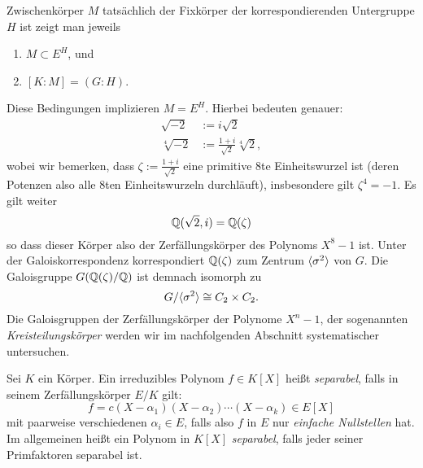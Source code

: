 \documentclass{book}
\begin{document}
\begin{exa}
    Zwischenkörper $M$ tatsächlich der Fixkörper der korrespondierenden
    Untergruppe $H$ ist zeigt man jeweils
    \begin{enumerate}[label = \arabic *.]
        \item $M \subset E^H$, und
        \item $[K:M] = (G:H)$.
    \end{enumerate}
    Diese Bedingungen implizieren $M = E^H$. Hierbei bedeuten genauer:
    \begin{align*}
        \sqrt{-2} & := i \sqrt{2}\\
        \sqrt[4]{-2} & := \frac{1+i}{\sqrt{2}}\sqrt[4]{2},
    \end{align*}
    wobei wir bemerken, dass $\zeta := \frac{1+i}{\sqrt{2}}$ eine primitive
    $8$te Einheitswurzel ist (deren Potenzen also alle $8$ten Einheitswurzeln
    durchläuft), insbesondere gilt $\zeta^4 = -1$. Es gilt weiter
    \[
        \mathbb{Q}(\sqrt{2}, i) = \mathbb{Q}(\zeta) 
    \]
    so dass dieser Körper also der Zerfällungskörper des Polynoms $X^8 - 1$
    ist. Unter der Galoiskorrespondenz korrespondiert $\mathbb{Q}(\zeta)$ zum Zentrum
    $\langle \sigma^2 \rangle$ von $G$. Die Galoisgruppe $G(\mathbb{Q}(\zeta)/\mathbb{Q})$ ist demnach
    isomorph zu
    \[
        G/\langle \sigma^2 \rangle \cong C_2 \times C_2.
    \]
    Die Galoisgruppen der Zerfällungskörper der Polynome $X^n -1$, der
    sogenannten {\em Kreisteilungskörper} werden wir im nachfolgenden Abschnitt
    systematischer untersuchen.
\end{exa}

\begin{defi}
    \label{defi:sep}
    Sei $K$ ein Körper. Ein irreduzibles Polynom $f \in K[X]$ heißt \emph{separabel}, falls in seinem Zerfällungskörper $E/K$ gilt:
    \[
        f = c (X-\alpha_1)(X-\alpha_2) \cdots (X-\alpha_k) \in E[X]
    \]
    mit paarweise verschiedenen $\alpha_i \in E$, falls also $f$ in $E$ nur
    \emph{einfache Nullstellen} hat. Im allgemeinen heißt ein Polynom in $K[X]$ \emph{separabel},
    falls jeder seiner Primfaktoren separabel ist. 
\end{defi}
\end{document}
